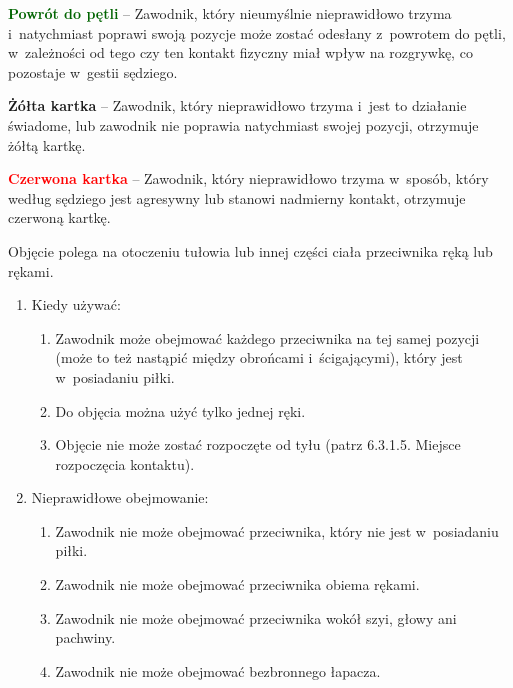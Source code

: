 \documentclass[12pt,a4paper]{article}
\renewcommand{\paragraph}[1]{
  \oldparagraph{#1}%
  \leftskip2.8cm
}
\newcommand\redcard[1]{\bgroup\textcolor{red}{\textbf{#1}}}
\newcommand\yellowcard[1]{\bgroup\textcolor{darkyellow}{\textbf{#1}}}
\newcommand\other[1]{\bgroup\textcolor{darkgreen}{\textbf{#1}}}
\begin{document}
\other{Powrót do pętli} -- Zawodnik, który nieumyślnie nieprawidłowo
trzyma i~natychmiast poprawi swoją pozycje może zostać odesłany z~powrotem do pętli, w~zależności od tego czy ten kontakt fizyczny miał
wpływ na rozgrywkę, co pozostaje w~gestii sędziego.

\yellowcard{Żółta kartka} -- Zawodnik, który nieprawidłowo trzyma i~jest to
działanie świadome, lub zawodnik nie poprawia natychmiast swojej
pozycji, otrzymuje żółtą kartkę.

\redcard{Czerwona kartka} -- Zawodnik, który nieprawidłowo trzyma w~sposób,
który według sędziego jest agresywny lub stanowi nadmierny kontakt,
otrzymuje czerwoną kartkę.

\paragraph{Obejmowanie}
Objęcie polega na otoczeniu tułowia lub
innej części ciała przeciwnika ręką lub rękami.

\begin{enumerate}
	\item
	      Kiedy używać:

	      \begin{enumerate}
		      \item
		            Zawodnik może obejmować każdego przeciwnika na tej samej pozycji
		            (może to też nastąpić między obrońcami i~ścigającymi), który jest w~posiadaniu piłki.
		      \item
		            Do objęcia można użyć tylko jednej ręki.
		      \item
		            Objęcie nie może zostać rozpoczęte od tyłu (patrz 6.3.1.5. Miejsce
		            rozpoczęcia kontaktu).
	      \end{enumerate}
	\item
	      Nieprawidłowe obejmowanie:

	      \begin{enumerate}
		      \item Zawodnik nie może obejmować przeciwnika, który nie jest w~posiadaniu
		            piłki.
		      \item
		            Zawodnik nie może obejmować przeciwnika obiema rękami.
		      \item
		            Zawodnik nie może obejmować przeciwnika wokół szyi, głowy ani
		            pachwiny.
		      \item
		            Zawodnik nie może obejmować bezbronnego łapacza.
	      \end{enumerate}
\end{enumerate}
\end{document}

